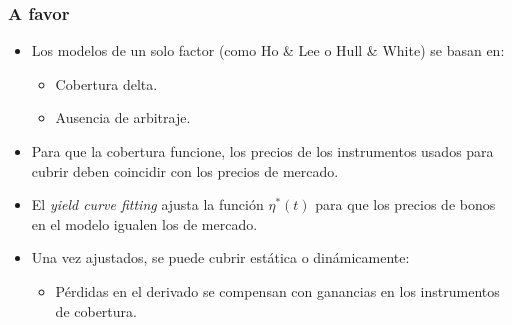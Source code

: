 \subsubsection*{A favor}
\begin{itemize}
    \item Los modelos de un solo factor (como Ho \& Lee o Hull \& White) se basan en:
    \begin{itemize}
        \item Cobertura delta.
        \item Ausencia de arbitraje.
    \end{itemize}
    \item Para que la cobertura funcione, los precios de los instrumentos usados para cubrir deben coincidir con los precios de mercado.
    \item El \textit{yield curve fitting} ajusta la función $\eta^*(t)$ para que los precios de bonos en el modelo igualen los de mercado.
    \item Una vez ajustados, se puede cubrir estática o dinámicamente:
    \begin{itemize}
        \item Pérdidas en el derivado se compensan con ganancias en los instrumentos de cobertura.
    \end{itemize}
\end{itemize}

